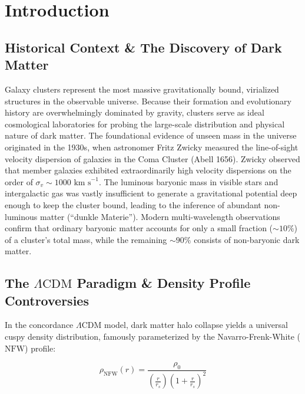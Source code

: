 \documentclass[twocolumn]{aastex631}
\begin{document}

\section{Introduction} \label{sec:intro}

\subsection{Historical Context \& The Discovery of Dark Matter}
Galaxy clusters represent the most massive gravitationally bound, virialized structures in the observable universe. Because their formation and evolutionary history are overwhelmingly dominated by gravity, clusters serve as ideal cosmological laboratories for probing the large-scale distribution and physical nature of dark matter. The foundational evidence of unseen mass in the universe originated in the 1930s, when astronomer Fritz Zwicky measured the line-of-sight velocity dispersion of galaxies in the Coma Cluster (Abell 1656). Zwicky observed that member galaxies exhibited extraordinarily high velocity dispersions on the order of $\sigma_{v} \sim 1000 \text{ km s}^{-1}$. The luminous baryonic mass in visible stars and intergalactic gas was vastly insufficient to generate a gravitational potential deep enough to keep the cluster bound, leading to the inference of abundant non-luminous matter (``dunkle Materie''). Modern multi-wavelength observations confirm that ordinary baryonic matter accounts for only a small fraction ($\sim 10\%$) of a cluster's total mass, while the remaining $\sim 90\%$ consists of non-baryonic dark matter.

\subsection{The $\Lambda \text{CDM}$ Paradigm \& Density Profile Controversies}
In the concordance $\Lambda\text{CDM}$ model, dark matter halo collapse yields a universal cuspy density distribution, famously parameterized by the Navarro-Frenk-White ($\text{NFW}$) profile:

\begin{equation}
	\rho_{\text{NFW}}(r) = \frac{\rho_0}{\left(\frac{r}{r_s}\right) \left(1 + \frac{r}{r_s}\right)^2}
\end{equation}
\end{document}

